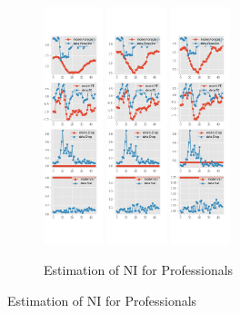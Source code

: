 \documentclass[]{article}
\begin{document}
\begin{figure}[ht]
	\centering
	\begin{subfigure}[b]{\textwidth}
		\centering
		\caption{Estimation of NI for Professionals}
		\label{NI_diag_SPF}
		\includegraphics[width=0.19\textwidth]{figures/spf_ni_est_diag0.png}
		\includegraphics[width=0.19\textwidth]{figures/spf_ni_est_diag1.png}
		\includegraphics[width=0.19\textwidth]{figures/spf_ni_est_diag2.png}

\end{subfigure}
\end{figure}
\end{document}
